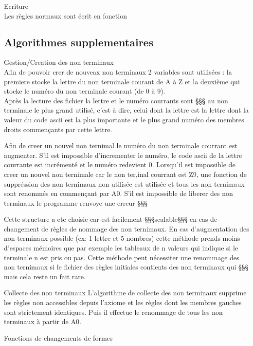 \documentclass{rapport}
\begin{document}
Ecriture \\
Les règles normaux sont écrit en fonction 

\subsection{Algorithmes supplementaires}
Gestion/Creation des non terminaux \\
Afin de pouvoir crer de nouveax non terminaux 2 variables sont utilisées : la premiere stocke la lettre du non terminale courant de A à Z et la deuxième qui stocke le numéro du non terminale courant (de 0 à 9). \\

Après la lecture des fichier la lettre et le numéro courrants sont §§§ au non terminale le plus grand utilisé, c'est à dire, celui dont la lettre est la lettre dont la valeur du code ascii est la plus importante et le plus grand numéro des membres droits commençants par cette lettre.

Afin de creer un nouvel non ternimal le numéro du non terminale courrant est augmenter. S'il est impossible d'incrementer le numéro, le code ascii de la lettre courrante est incrémenté et le numéro redevient 0. Lorsqu'il est impossible de creer un nouvel non ternimale car le non ter,inal courrant est Z9, une fonction de suppréssion des non ternimaux non utilisée est utilisée et tous les non ternimaux sont renommés en commençant par A0.
S'il est impossible de liberer des non terminaux le programme renvoye une erreur §§§

Cette structure a ete choisie car est facilement §§§scalable§§§ en cas de changement de règles de nommage des non ternimaux. En cas d'augmentation des non terminaux possible (ex: 1 lettre et 5 nombres) cette méthode prends moins d'espaces mémoires que par exemple les tableaux de n valeurs qui indique si le terminale n est pris ou pas.
Cette méthode peut nécessiter une renommage des non ternimaux si le fichier des règles initiales contients des non terminaux qui §§§ mais cela reste un fait rare.

Collecte des non terminaux
L'algorithme de collecte des non terminaux supprime les règles non accessibles depuis l'axiome et les règles dont les membres gauches sont strictement identiques. Puis il effectue le renommage de tous les non terminaux à partir de A0.


Fonctions de changements de formes









 
\end{document}
